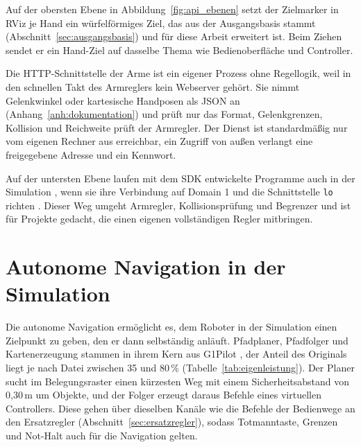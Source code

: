 Auf der obersten Ebene in Abbildung~\ref{fig:api_ebenen} setzt der Zielmarker in RViz je Hand ein würfelförmiges Ziel, das aus der Ausgangsbasis stammt (Abschnitt~\ref{sec:ausgangsbasis}) und für diese Arbeit erweitert ist.
Beim Ziehen sendet er ein Hand-Ziel auf dasselbe Thema wie Bedienoberfläche und Controller.

Die HTTP-Schnittstelle der Arme ist ein eigener Prozess ohne Regellogik, weil in den schnellen Takt des Armreglers kein Webserver gehört.
Sie nimmt Gelenkwinkel oder kartesische Handposen als JSON an (Anhang~\ref{anh:dokumentation}) und prüft nur das Format, Gelenkgrenzen, Kollision und Reichweite prüft der Armregler.
Der Dienst ist standardmäßig nur vom eigenen Rechner aus erreichbar, ein Zugriff von außen verlangt eine freigegebene Adresse und ein Kennwort.

Auf der untersten Ebene laufen mit dem SDK entwickelte Programme auch in der Simulation \cite{UnitreeMujoco}, wenn sie ihre Verbindung auf Domain 1 und die Schnittstelle \texttt{lo} richten \cite{UnitreeMujoco}.
Dieser Weg umgeht Armregler, Kollisionsprüfung und Begrenzer und ist für Projekte gedacht, die einen eigenen vollständigen Regler mitbringen.

\section{Autonome Navigation in der Simulation}
\label{sec:navigation}
Die autonome Navigation ermöglicht es, dem Roboter in der Simulation einen Zielpunkt zu geben, den er dann selbständig anläuft.
Pfadplaner, Pfadfolger und Kartenerzeugung stammen in ihrem Kern aus G1Pilot \cite{HucebotG1Pilot}, der Anteil des Originals liegt je nach Datei zwischen 35 und 80\,\% (Tabelle~\ref{tab:eigenleistung}).
Der Planer sucht im Belegungsraster einen kürzesten Weg mit einem Sicherheitsabstand von 0,30\,m um Objekte, und der Folger erzeugt daraus Befehle eines virtuellen Controllers.
Diese gehen über dieselben Kanäle wie die Befehle der Bedienwege an den Ersatzregler (Abschnitt~\ref{sec:ersatzregler}), sodass Totmanntaste, Grenzen und Not-Halt auch für die Navigation gelten.

